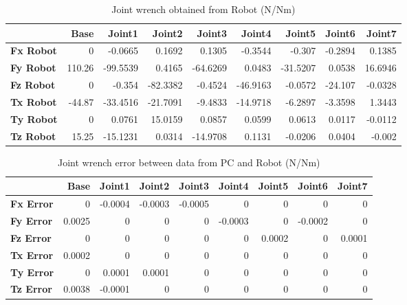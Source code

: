 \begin{table}[h!]
	\centering
	\caption{Joint wrench obtained from Robot (N/Nm)}
	\label{wrech_Robot_Pose14}
	\begin{tabular}{|l|r|r|r|r|r|r|r|r|}
		\hline
		\textbf{} & \textbf{Base} & \textbf{Joint1}  & \textbf{Joint2}  & \textbf{Joint3}  & \textbf{Joint4}  & \textbf{Joint5}  & \textbf{Joint6}  & \textbf{Joint7} \\ \hline
		\textbf{Fx Robot}  & 0        & -0.0665        & 0.1692        & 0.1305        & -0.3544        & -0.307        & -0.2894        & 0.1385 \\ \hline
		\textbf{Fy Robot}  & 110.26        & -99.5539        & 0.4165        & -64.6269        & 0.0483        & -31.5207        & 0.0538        & 16.6946 \\ \hline
		\textbf{Fz Robot}  & 0        & -0.354        & -82.3382        & -0.4524        & -46.9163        & -0.0572        & -24.107        & -0.0328 \\ \hline
		\textbf{Tx Robot}  & -44.87        & -33.4516        & -21.7091        & -9.4833        & -14.9718        & -6.2897        & -3.3598        & 1.3443 \\ \hline
		\textbf{Ty Robot}  & 0        & 0.0761        & 15.0159        & 0.0857        & 0.0599        & 0.0613        & 0.0117        & -0.0112 \\ \hline
		\textbf{Tz Robot}  & 15.25        & -15.1231        & 0.0314        & -14.9708        & 0.1131        & -0.0206        & 0.0404        & -0.002 \\ \hline
	\end{tabular}
\end{table}

\begin{table}[h!]
	\centering
	\caption{Joint wrench error between data from PC and Robot (N/Nm)}
	\label{wrech_Error_Pose14}
	\begin{tabular}{|l|r|r|r|r|r|r|r|r|}
		\hline
		\textbf{}  & \textbf{Base} & \textbf{Joint1}  & \textbf{Joint2}  & \textbf{Joint3}  & \textbf{Joint4}  & \textbf{Joint5}  & \textbf{Joint6}  & \textbf{Joint7} \\ \hline
		\textbf{Fx Error}  & 0        & -0.0004        & -0.0003        & -0.0005        & 0        & 0        & 0        & 0 \\ \hline
		\textbf{Fy Error}  & 0.0025        & 0        & 0        & 0        & -0.0003        & 0        & -0.0002        & 0 \\ \hline
		\textbf{Fz Error}  & 0        & 0        & 0        & 0        & 0        & 0.0002        & 0        & 0.0001 \\ \hline
		\textbf{Tx Error}  & 0.0002        & 0        & 0        & 0        & 0        & 0        & 0        & 0 \\ \hline
		\textbf{Ty Error}  & 0        & 0.0001        & 0.0001        & 0        & 0        & 0        & 0        & 0 \\ \hline
		\textbf{Tz Error}  & 0.0038        & -0.0001        & 0        & 0        & 0        & 0        & 0        & 0 \\ \hline
	\end{tabular}
\end{table}

